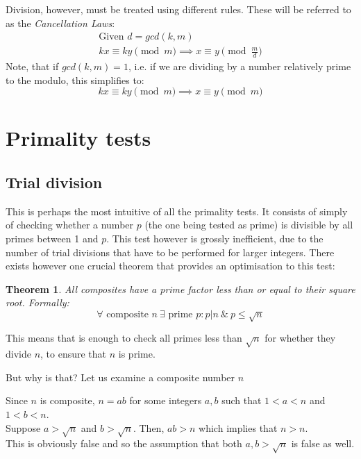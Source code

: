 \documentclass[12pt, titlepage]{article}
\newtheorem{theorem}{Theorem}
\begin{document}
    Division, however, must be treated using different rules. These will be
    referred to as the \emph{Cancellation Laws}:
    \begin{gather*}
        \text{Given } d = gcd(k, m)\\
        kx \equiv ky \pmod{m} \implies x \equiv y \pmod{\frac{m}{d}}
    \end{gather*}
    Note, that if $gcd(k, m) = 1$, i.e. if we are dividing by a number
    relatively prime to the modulo, this simplifies to:
    \begin{equation*}
        kx \equiv ky \pmod{m} \implies x \equiv y \pmod{m}
    \end{equation*}


\section{Primality tests}
    \subsection{Trial division}

    This is perhaps the most intuitive of all the primality tests. It consists
    of simply of checking whether a number $p$ (the one being tested as prime)
    is divisible by all primes between 1 and $p$. This test however is grossly
    inefficient, due to the number of trial divisions that have to be performed
    for larger integers. There exists however one crucial theorem that provides
    an optimisation to this test:
    \begin{theorem} \label{th:prime_factors_less_than_root}
        All composites have a prime factor less than or equal to their square
        root. Formally:\\
        $$\forall \text{ composite } n \: \exists \text{ prime } p:p|n \: \& \: p \leq \sqrt{n}$$
    \end{theorem}
    This means that is enough to check all primes less than $\sqrt{n}$ for
    whether they divide $n$, to ensure that $n$ is prime. 
    
    But why is that? Let us examine a composite number $n$

    Since $n$ is composite, $n=ab$ for some integers $a, b$ such that $1<a<n$
    and $1<b<n$.\\
    Suppose $a>\sqrt{n}$ and $b>\sqrt{n}$. Then, $ab>n$ which implies that
    $n>n$. \\
    This is obviously false and so the assumption that both $a,b > \sqrt{n}$
    is false as well.
\end{document}
